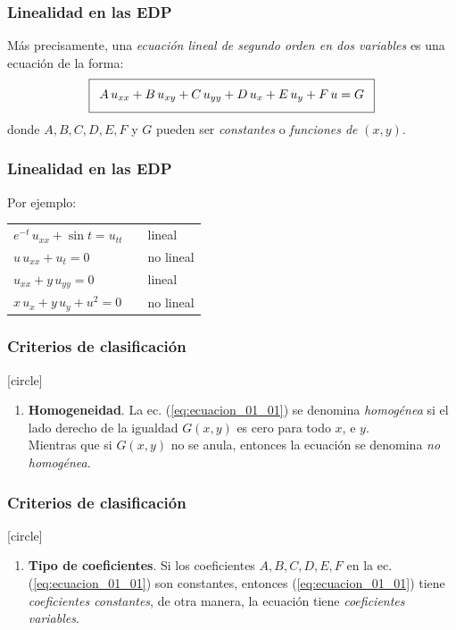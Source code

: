\documentclass[12pt]{beamer}
\begin{document}
\begin{frame}
\frametitle{Linealidad en las EDP}
Más precisamente, una \emph{ecuación lineal de segundo orden en dos variables} es una ecuación de la forma:
\pause
\begin{align}
\addtolength{\fboxsep}{5pt}\boxed{ A \, u_{xx} + B \, u_{xy} + C \, u_{yy} + D \, u_{x} + E \, u_{y} + F \, u = G}
\label{eq:ecuacion_01_01}
\end{align}
donde $A, B, C, D, E, F$ y $G$ pueden ser \emph{constantes} o \emph{funciones de} $(x, y)$.
\end{frame}
\begin{frame}
\frametitle{Linealidad en las EDP}
Por ejemplo:
\pause
\begin{table}[H]
\centering
\large
\begin{tabular}{l p{1cm} l}
\Large{$e^{-t} \, u_{xx} + \sin t = u_{tt}$} & & lineal \\ \pause
\Large{$u \, u_{xx} + u_{t} = 0$} & & no lineal \\ \pause
\Large{$u_{xx} + y \, u_{yy} = 0$} & & lineal \\ \pause
\Large{$x \, u_{x} + y \, u_{y} + u^{2} = 0$} & & no lineal
\end{tabular}
\end{table}
\end{frame}
\begin{frame}
\frametitle{Criterios de clasificación}
[circle]
\begin{enumerate}[<+->]    
\conti
\item \textbf{Homogeneidad}. La ec. (\ref{eq:ecuacion_01_01}) se denomina \emph{homogénea} si el lado derecho de la igualdad $G(x, y)$ es cero para todo $x$, e $y$.
\\
\bigskip
\pause
Mientras que si $G(x, y)$ no se anula, entonces la ecuación se denomina \emph{no homogénea}.
\seti
\end{enumerate}
\end{frame}
\begin{frame}
\frametitle{Criterios de clasificación}
[circle]
\begin{enumerate}[<+->]    
\conti
\item \textbf{Tipo de coeficientes}. Si los coeficientes $A, B, C, D, E, F$ en la ec. (\ref{eq:ecuacion_01_01}) son constantes, entonces (\ref{eq:ecuacion_01_01}) tiene \emph{coeficientes constantes}, de otra manera, la ecuación tiene \emph{coeficientes variables}.
\seti
\end{enumerate}
\end{frame}
\end{document}
